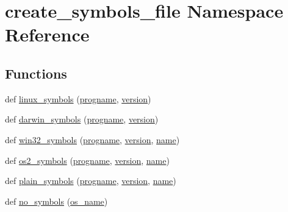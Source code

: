 \hypertarget{namespacecreate__symbols__file}{}\section{create\+\_\+symbols\+\_\+file Namespace Reference}
\label{namespacecreate__symbols__file}
\subsection*{Functions}
\begin{DoxyCompactItemize}
\item 
def \hyperlink{namespacecreate__symbols__file_a1ca7ea1fac8263711a8d669c049f38e0}{linux\+\_\+symbols} (\hyperlink{namespacecreate__symbols__file_a731257e83bedb555f221c927882e19d1}{progname}, \hyperlink{lib_2expat_8h_aec5db107b91447a96c47961ce9df2660}{version})
\item 
def \hyperlink{namespacecreate__symbols__file_a825b8d6473659599c17cbf6b8281b4fa}{darwin\+\_\+symbols} (\hyperlink{namespacecreate__symbols__file_a731257e83bedb555f221c927882e19d1}{progname}, \hyperlink{lib_2expat_8h_aec5db107b91447a96c47961ce9df2660}{version})
\item 
def \hyperlink{namespacecreate__symbols__file_a48be2cbe7232883616779c3e24ee24cd}{win32\+\_\+symbols} (\hyperlink{namespacecreate__symbols__file_a731257e83bedb555f221c927882e19d1}{progname}, \hyperlink{lib_2expat_8h_aec5db107b91447a96c47961ce9df2660}{version}, \hyperlink{lib_2expat_8h_a1b49b495b59f9e73205b69ad1a2965b0}{name})
\item 
def \hyperlink{namespacecreate__symbols__file_a7b1b8e43affdd91ff4ea7d98b733ab73}{os2\+\_\+symbols} (\hyperlink{namespacecreate__symbols__file_a731257e83bedb555f221c927882e19d1}{progname}, \hyperlink{lib_2expat_8h_aec5db107b91447a96c47961ce9df2660}{version}, \hyperlink{lib_2expat_8h_a1b49b495b59f9e73205b69ad1a2965b0}{name})
\item 
def \hyperlink{namespacecreate__symbols__file_a38ba3377661a93cf27c310e27726dd98}{plain\+\_\+symbols} (\hyperlink{namespacecreate__symbols__file_a731257e83bedb555f221c927882e19d1}{progname}, \hyperlink{lib_2expat_8h_aec5db107b91447a96c47961ce9df2660}{version}, \hyperlink{lib_2expat_8h_a1b49b495b59f9e73205b69ad1a2965b0}{name})
\item 
def \hyperlink{namespacecreate__symbols__file_a797092f5c5f44992761cb28a8f825ca3}{no\+\_\+symbols} (\hyperlink{namespacecreate__symbols__file_ab8c6d58818e94ccbf7184eac90e288b3}{os\+\_\+name})
\end{DoxyCompactItemize}
